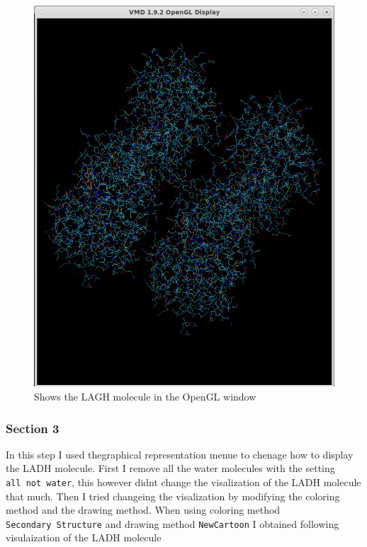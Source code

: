 \documentclass[11pt]{article}
\makeatletter
\def\maxwidth{\ifdim\Gin@nat@width>\linewidth\linewidth
    \else\Gin@nat@width\fi}
\let\Oldincludegraphics\includegraphics
\renewcommand{\includegraphics}[1]{\Oldincludegraphics[width=.8\maxwidth]{#1}}
\makeatother
\begin{document}
\begin{figure}
\centering
\includegraphics{Screenshot_ladh_in_opengl.png}
\caption{Shows the LAGH molecule in the OpenGL window}
\end{figure}

\subsubsection{Section 3}\label{section-3}

In this step I used thegraphical representation menue to chenage how to
display the LADH molecule. First I remove all the water molecules with
the setting \texttt{all\ not\ water}, this however didnt change the
visalization of the LADH molecule that much. Then I tried changeing the
visalization by modifying the coloring method and the drawing method.
When using coloring method \texttt{Secondary\ Structure} and drawing
method \texttt{NewCartoon} I obtained following visulaization of the
LADH molecule
\end{document}
